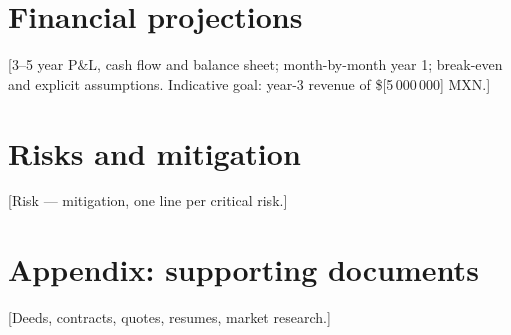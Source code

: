 \documentclass[12pt]{article}
\newcommand{\Moneda}{MXN}
\newcommand{\IngresoAnioTres}{[5\,000\,000]}
\begin{document}
\section{Financial projections}
[3–5 year P\&L, cash flow and balance sheet; month-by-month year 1;
break-even and explicit assumptions. Indicative goal: year-3 revenue of
\$\IngresoAnioTres{} \Moneda{}.]

\section{Risks and mitigation}
[Risk — mitigation, one line per critical risk.]

\appendix
\section{Appendix: supporting documents}
[Deeds, contracts, quotes, resumes, market research.]
\end{document}
